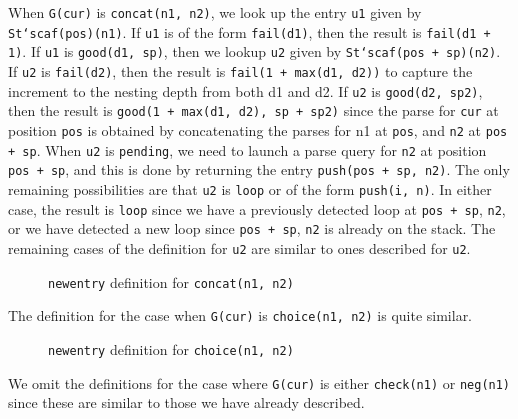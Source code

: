 \documentclass[sigplan,10pt,anonymous,review]{acmart}\settopmatter{printfolios=true,printccs=false,printacmref=false}
\begin{document}
\begin{CCSXML}
When \texttt{G(cur)} is \texttt{concat(n1, n2)}, we look up the entry \texttt{u1}
given by \texttt{St`scaf(pos)(n1)}\@.   If \texttt{u1} is of the form \texttt{fail(d1)}, then
the result is \texttt{fail(d1 + 1)}\@.  If \texttt{u1} is \texttt{good(d1, sp)}, then
we lookup \texttt{u2} given by \texttt{St`scaf(pos + sp)(n2)}\@.  If
\texttt{u2} is \texttt{fail(d2)}, then the result is \texttt{fail(1 + max(d1, d2))} to capture the increment to the nesting depth from both d1 and d2.
If \texttt{u2} is \texttt{good(d2, sp2)}, then the result is
\texttt{good(1 + max(d1, d2), sp + sp2)} since the parse for \texttt{cur} at position \texttt{pos} is obtained by concatenating the parses for n1 at \texttt{pos}, and
\texttt{n2} at \texttt{pos + sp}\@.  When \texttt{u2} is \texttt{pending},
we need to launch a parse query for \texttt{n2} at position \texttt{pos + sp},
and this is done by returning the entry \texttt{push(pos + sp, n2)}\@.
The only remaining possibilities are that \texttt{u2} is \texttt{loop} or
of the form \texttt{push(i, n)}\@.  In either case, the result is \texttt{loop}
since we have a previously detected loop at \texttt{pos + sp}, \texttt{n2},
or we have detected a new loop since \texttt{pos + sp}, \texttt{n2} is already
on the stack.  The remaining cases of the definition for \texttt{u2}
are similar to ones described for \texttt{u2}\@.  

\begin{figure}[h!]
  
    \vspace*{-4mm}
\caption{\small \texttt{newentry} definition for \texttt{concat(n1, n2)}}
\label{pvs:newentry_concat}
\end{figure}

The definition for the case when \texttt{G(cur)} is \texttt{choice(n1, n2)}
is quite similar.
\begin{figure}[h!]
  
    \vspace*{-4mm}
\caption{\small \texttt{newentry} definition for \texttt{choice(n1, n2)}}
\label{pvs:newentry_choice}
\end{figure}

We omit the definitions for the case where \texttt{G(cur)} is either \texttt{check(n1)}
or \texttt{neg(n1)} since these are similar to those we have already described. 


%   


\end{CCSXML}
\end{document}
